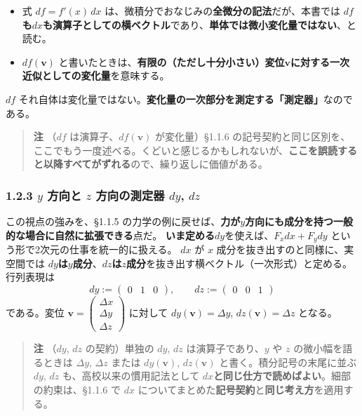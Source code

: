 \documentclass[a4paper,12pt,openany]{book}
\begin{document}
\begin{itemize}
\item
  式 \(df = f'(x)\,dx\)
  は、微積分でおなじみの\textbf{全微分の記法}だが、本書では
  \(df\)\textbf{も}\(dx\)\textbf{も演算子としての横ベクトル}であり、\textbf{単体では微小変化量ではない}、と読む。
\item
  \(df(\mathbf{v})\)
  と書いたときは、\textbf{有限の（ただし十分小さい）変位}\(\mathbf{v}\)\textbf{に対する一次近似としての変化量}を意味する。
\end{itemize}

\(df\)
それ自体は変化量ではない。\textbf{変化量の一次部分を測定する「測定器」}なのである。

\begin{quote}
\textbf{注} （\(df\) は演算子、\(df(\mathbf{v})\) が変化量）§1.1.6
の記号契約と同じ区別を、ここでもう一度述べる。くどいと感じるかもしれないが、\textbf{ここを誤読すると以降すべてがずれる}ので、繰り返しに価値がある。
\end{quote}

\hypertarget{y-ux65b9ux5411ux3068-z-ux65b9ux5411ux306eux6e2cux5b9aux5668-dy-dz}{%
\subsubsection{\texorpdfstring{1.2.3 \(y\) 方向と \(z\) 方向の測定器
\(dy\),
\(dz\)}{1.2.3 y 方向と z 方向の測定器 dy, dz}}\label{y-ux65b9ux5411ux3068-z-ux65b9ux5411ux306eux6e2cux5b9aux5668-dy-dz}}

この視点の強みを、§1.1.5
の力学の例に戻せば、\textbf{力が}\(y\)\textbf{方向にも成分を持つ一般的な場合に自然に拡張できる}点だ。
\textbf{いま定める}\(dy\)を使えば、\(F_x dx + F_y dy\)
という形で2次元の仕事を統一的に扱える。 \(dx\) が \(x\)
成分を抜き出すのと同様に、実空間では
\(dy\)\textbf{は}\(y\)\textbf{成分}、\(dz\)\textbf{は}\(z\)\textbf{成分}を抜き出す横ベクトル（一次形式）と定める。行列表現は
\[dy := \begin{pmatrix} 0 & 1 & 0 \end{pmatrix}, \qquad dz := \begin{pmatrix} 0 & 0 & 1 \end{pmatrix}\]
である。変位
\(\mathbf{v} = \begin{pmatrix} \Delta x \\ \Delta y \\ \Delta z \end{pmatrix}\)
に対して \(dy(\mathbf{v}) = \Delta y\), \(dz(\mathbf{v}) = \Delta z\)
となる。

\begin{quote}
\textbf{注} （\(dy\), \(dz\) の契約）単独の \(dy\), \(dz\)
は演算子であり、\(y\) や \(z\) の微小幅を語るときは \(\Delta y\),
\(\Delta z\) または \(dy(\mathbf{v})\), \(dz(\mathbf{v})\)
と書く。積分記号の末尾に並ぶ \(dy\), \(dz\) も、高校以来の慣用記法として
\(dx\)\textbf{と同じ仕方で読めばよい}。細部の約束は、§1.1.6 で \(dx\)
についてまとめた\textbf{記号契約}と\textbf{同じ考え方}を適用する。
\end{quote}
\end{document}
